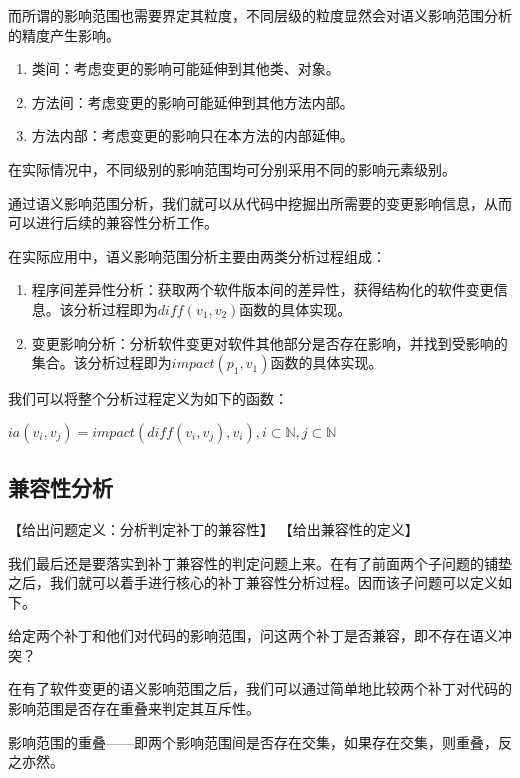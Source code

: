 而所谓的影响范围也需要界定其粒度，不同层级的粒度显然会对语义影响范围分析的精度产生影响。

\begin{enumerate}
	\item 类间：考虑变更的影响可能延伸到其他类、对象。
	\item 方法间：考虑变更的影响可能延伸到其他方法内部。
	\item 方法内部：考虑变更的影响只在本方法的内部延伸。
\end{enumerate}

在实际情况中，不同级别的影响范围均可分别采用不同的影响元素级别。

通过语义影响范围分析，我们就可以从代码中挖掘出所需要的变更影响信息，从而可以进行后续的兼容性分析工作。

在实际应用中，语义影响范围分析主要由两类分析过程组成：
\begin{enumerate}
	\item 程序间差异性分析：获取两个软件版本间的差异性，获得结构化的软件变更信息。该分析过程即为$diff(v_1,v_2)$函数的具体实现。
	\item 变更影响分析：分析软件变更对软件其他部分是否存在影响，并找到受影响的集合。该分析过程即为$impact(p_1,v_1)$函数的具体实现。
\end{enumerate}


我们可以将整个分析过程定义为如下的函数：

\begin{definition}
	$ia(v_i,v_j) = impact(diff(v_i,v_j),v_i),i \subset \mathbb{N}, j \subset \mathbb{N}$
\end{definition}


\subsection{兼容性分析}

【给出问题定义：分析判定补丁的兼容性】
【给出兼容性的定义】

我们最后还是要落实到补丁兼容性的判定问题上来。在有了前面两个子问题的铺垫之后，我们就可以着手进行核心的补丁兼容性分析过程。因而该子问题可以定义如下。

\begin{problem}
	给定两个补丁和他们对代码的影响范围，问这两个补丁是否兼容，即不存在语义冲突？
\end{problem}

在有了软件变更的语义影响范围之后，我们可以通过简单地比较两个补丁对代码的影响范围是否存在重叠来判定其互斥性。

\begin{definition}
	影响范围的重叠——即两个影响范围间是否存在交集，如果存在交集，则重叠，反之亦然。
\end{definition}

